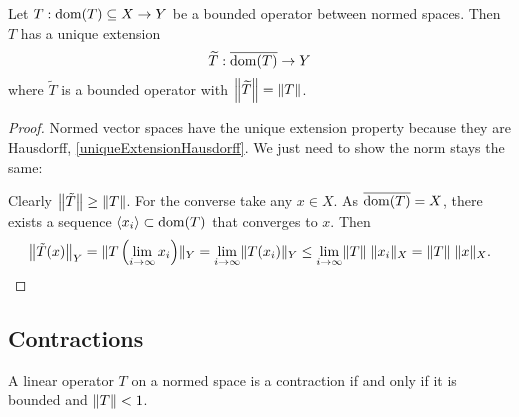 \begin{proposition} \label{BLT}
Let $T:\dom(T)\subseteq X\to Y$ be a bounded operator between normed spaces. Then $T$ has a unique extension
\[ \widetilde{T}:\overline{\dom(T)}\to Y \]
where $\widetilde{T}$ is a bounded operator with $\norm*{\widetilde{T}} = \norm{T}$.
\end{proposition}
\begin{proof}
Normed vector spaces have the unique extension property because they are Hausdorff, \ref{uniqueExtensionHausdorff}. We just need to show the norm stays the same:

Clearly $\norm*{\tilde{T}} \geq \norm{T}$. For the converse take any $x\in X$. As $\overline{\dom(T)} = X$, there exists a sequence $\seq{x_i}\subset \dom(T)$ that converges to $x$. Then
\[ \norm*{\tilde{T}(x)}_Y = \norm{T\left(\lim_{i\to\infty}x_i\right)}_Y = \lim_{i\to\infty}\norm{T(x_i)}_Y \leq \lim_{i\to\infty}\norm{T}\;\norm{x_i}_X = \norm{T}\;\norm{x}_X. \]
\end{proof}

\subsection{Contractions}
A linear operator $T$ on a normed space is a contraction if and only if it is bounded and $\norm{T}<1$. 

